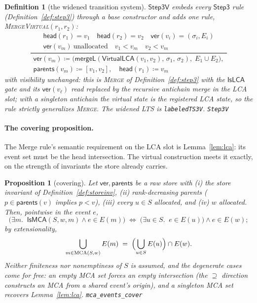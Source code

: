 \documentclass[11pt]{article}
\newtheorem{definition}[theorem]{Definition}
\newtheorem{proposition}[theorem]{Proposition}
\newcommand{\mergeL}{\mathsf{mergeL}}
\newcommand{\lean}[1]{\texttt{#1}}
\begin{document}
\begin{definition}[the widened transition system]
\label{def:step3v}
$\mathsf{Step3V}$ embeds every $\mathsf{Step3}$ rule
(Definition~\ref{def:step3}) through a base constructor and adds one rule,
\textsc{MergeVirtual}$(r_1, r_2)$:
\[
\frac{\begin{array}{c}
  \mathsf{head}(r_1) = v_1 \quad \mathsf{head}(r_2) = v_2 \quad
  \mathsf{ver}(v_i) = (\sigma_i, E_i) \\
  \mathsf{ver}(v_m)\ \text{unallocated} \quad v_1 < v_m \quad v_2 < v_m
\end{array}}{\begin{array}{c}
  \mathsf{ver}(v_m) \coloneqq
  \bigl(\mergeL(\mathsf{VirtualLCA}(v_1, v_2),\, \sigma_1,\, \sigma_2),\;
  E_1 \cup E_2\bigr), \\
  \mathsf{parents}(v_m) \coloneqq [v_1, v_2],
  \quad \mathsf{head}(r_1) \coloneqq v_m
\end{array}}
\]
with visibility unchanged: this is \textsc{Merge} of Definition~\ref{def:step3} with the
$\mathsf{IsLCA}$ gate and its $\mathsf{ver}(v_\ell)$ read replaced by the recursive
antichain merge in the LCA slot; with a singleton antichain the virtual state
\emph{is} the registered LCA state, so the rule strictly generalizes
\textsc{Merge}. The widened LTS is \lean{labeledTS3V}.
\hfill\lean{Step3V}
\end{definition}

\paragraph{The covering proposition.} The Merge rule's semantic
requirement on the LCA slot is Lemma~\ref{lem:lca}: its event set must
be the head intersection. The virtual construction meets it exactly, on
the strength of invariants the store already carries.

\begin{proposition}[covering]
\label{prop:cover}
Let $\mathsf{ver}, \mathsf{parents}$ be a raw store with (i) the store
invariant of Definition~\ref{def:storeinv}, (ii) rank-decreasing parents
($p \in \mathsf{parents}(v)$ implies $p < v$), (iii) every $u \in S$
allocated, and (iv) $w$ allocated. Then, pointwise in the event $e$,
\[
  \bigl(\exists m.\;\; \mathsf{IsMCA}(S, w, m) \wedge e \in E(m)\bigr)
  \;\Longleftrightarrow\;
  \bigl(\exists u \in S.\;\; e \in E(u)\bigr) \wedge e \in E(w) ;
\]
by extensionality,
\[
  \bigcup_{m \in \mathrm{MCA}(S, w)} E(m)
  \;=\;
  \Bigl(\bigcup_{u \in S} E(u)\Bigr) \cap E(w).
\]
Neither finiteness nor nonemptiness of $S$ is assumed, and the degenerate
cases come for free: an empty MCA set forces an empty intersection (the
$\supseteq$ direction \emph{constructs} an MCA from a shared event's
origin), and a singleton MCA set recovers Lemma~\ref{lem:lca}.
\hfill\lean{mca\_events\_cover}
\end{proposition}
\end{document}
